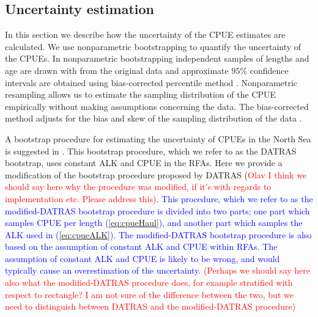 \documentclass[a4paper 12pt]{article}
\numberwithin{equation}{section}
\newcommand{\ed}[1]{\textcolor{red}{#1}}
\newcommand{\nat}[1]{\textcolor{blue}{#1}}
\begin{document}
\subsection{Uncertainty estimation}
\label{sec:uncertaintyestimation}
In this section we describe how the uncertainty of the CPUE estimates are calculated. We use nonparametric bootstrapping to quantify the uncertainty of the CPUEs. In nonparametric bootstrapping independent samples of lengths and age are drawn with from the original data and approximate $95\%$ confidence intervals are obtained using bias-corrected percentile method  \citep{carpenter2000bootstrap}. Nonparametric resampling allows us to estimate the sampling distribution of the CPUE empirically without making assumptions concerning the data. The bias-corrected method adjusts for the bias and skew of the sampling distribution of the data \citep{puth2015variety, karlsson2009bootstrap}. 

A bootstrap procedure for estimating the uncertainty of CPUEs in the North Sea is suggested in \citet{ICES2006Report}. This bootstrap procedure, which we refer to as the DATRAS bootstrap, uses constant ALK and CPUE in the RFAs. Here we provide a modification of the bootstrap procedure proposed by DATRAS (\ed{Olav I think we should say here why the procedure was modified, if it's with regards to implementation etc. Please address this)}. \nat{This procedure, which we refer to as the modified-DATRAS bootstrap procedure is divided into two parts; one part which samples CPUE per length (\ref{eq:cpueHaul}), and another part which samples the ALK used in (\ref{eq:cpueALK}). The modified-DATRAS bootstrap procedure is also based on the assumption of constant ALK and CPUE within RFAs. The assumption of constant ALK and CPUE is likely to be wrong, and would typically cause an overestimation of the uncertainty. \ed{(Perhaps we should say here also what the modified-DATRAS procedure does, for example stratified with respect to rectangle? I am not sure of the difference between the two, but we need to distinguish between DATRAS and the modified-DATRAS procedure)}} 
\end{document}
